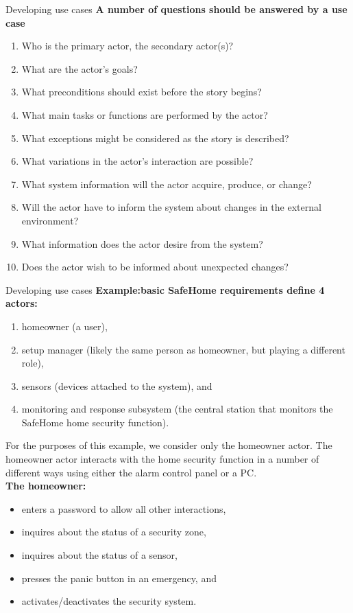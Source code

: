 \documentclass{beamer}
\begin{document}
\begin{frame}{Developing use cases}
\textbf{A number of questions should be answered by a use case}\\
\begin{enumerate}
	\item Who is the primary actor, the secondary actor(s)?
	\item What are the actor’s goals?
	\item What preconditions should exist before the story begins?
	\item What main tasks or functions are performed by the actor?
	\item What exceptions might be considered as the story is described?
	\item What variations in the actor’s interaction are possible?
	\item What system information will the actor acquire, produce, or change?
	\item Will the actor have to inform the system about changes in the external environment?
	\item What information does the actor desire from the system?
	\item Does the actor wish to be informed about unexpected changes?
	
\end{enumerate}
\end{frame}
\begin{frame}{Developing use cases}
	\textbf{Example:basic SafeHome requirements define 4 actors:}
	\begin{enumerate}
		\item homeowner (a user), 
		\item setup manager (likely the same person as homeowner, but playing a different role), 
		\item sensors (devices attached to the system), and 
		\item monitoring and response subsystem (the central station that monitors the SafeHome home security function). 
		
	\end{enumerate}
	For the purposes of this example, we consider only the homeowner actor. The 
	homeowner actor interacts with the home security function in a number of 
	different ways using either the alarm control panel or a PC. \\
		\textbf{The homeowner:}
	\begin{itemize}
		\item enters a password to allow all other interactions, 
		\item inquires about the status of a security zone, 
		\item inquires about the status of a sensor, 
		\item presses the panic button in an emergency, and 
		\item activates/deactivates the security system.
		
	\end{itemize}
\end{frame}
\end{document}
